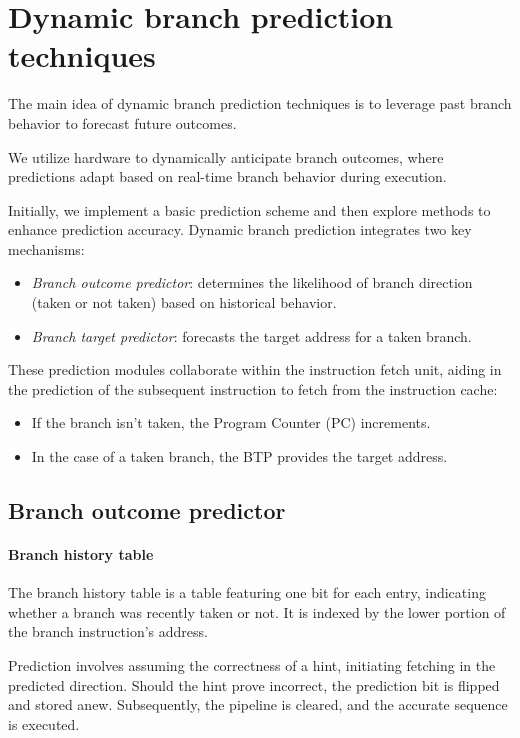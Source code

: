 \section{Dynamic branch prediction techniques}

The main idea of dynamic branch prediction techniques is to leverage past branch behavior to forecast future outcomes.

We utilize hardware to dynamically anticipate branch outcomes, where predictions adapt based on real-time branch behavior during execution.

Initially, we implement a basic prediction scheme and then explore methods to enhance prediction accuracy.
Dynamic branch prediction integrates two key mechanisms:
\begin{itemize}
    \item \textit{Branch outcome predictor}: determines the likelihood of branch direction (taken or not taken) based on historical behavior.
    \item \textit{Branch target predictor}: forecasts the target address for a taken branch.
\end{itemize}
These prediction modules collaborate within the instruction fetch unit, aiding in the prediction of the subsequent instruction to fetch from the instruction cache:
\begin{itemize}
    \item If the branch isn't taken, the Program Counter (PC) increments.
    \item In the case of a taken branch, the BTP provides the target address.
\end{itemize}

\subsection{Branch outcome predictor}
\paragraph*{Branch history table}
The branch history table is a table featuring one bit for each entry, indicating whether a branch was recently taken or not. 
It is indexed by the lower portion of the branch instruction's address.

Prediction involves assuming the correctness of a hint, initiating fetching in the predicted direction. 
Should the hint prove incorrect, the prediction bit is flipped and stored anew. 
Subsequently, the pipeline is cleared, and the accurate sequence is executed.

